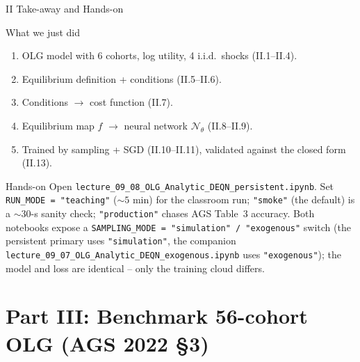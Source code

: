 \documentclass[aspectratio=169,11pt]{beamer}
\newcommand{\emphc}[1]{\textcolor{harvardcrimson}{#1}}
\newcommand{\N}{\mathcal{N}}
\begin{document}
\begin{frame}{II Take-away and Hands-on}
\footnotesize
\begin{block}{What we just did}
\begin{enumerate}\itemsep1pt
    \item OLG model with 6 cohorts, log utility, 4 i.i.d.\ shocks (II.1--II.4).
    \item Equilibrium definition + conditions (II.5--II.6).
    \item Conditions $\to$ \emphc{cost function} (II.7).
    \item Equilibrium map $f$ $\to$ neural network $\N_\theta$ (II.8--II.9).
    \item Trained by sampling + SGD (II.10--II.11), \emphc{validated} against the closed form (II.13).
\end{enumerate}
\end{block}

\begin{block}{Hands-on}
Open \texttt{lecture\_09\_08\_OLG\_Analytic\_DEQN\_persistent.ipynb}.  Set \texttt{RUN\_MODE = "teaching"} ($\sim 5$ min) for the classroom run; \texttt{"smoke"} (the default) is a $\sim$30-s sanity check; \texttt{"production"} chases AGS Table~3 accuracy.  Both notebooks expose a \texttt{SAMPLING\_MODE = "simulation" / "exogenous"} switch (the persistent primary uses \texttt{"simulation"}, the companion \texttt{lecture\_09\_07\_OLG\_Analytic\_DEQN\_exogenous.ipynb} uses \texttt{"exogenous"}); the model and loss are identical -- only the training cloud differs.
\end{block}
\end{frame}



\section{Part III: Benchmark 56-cohort OLG (AGS 2022 \S 3)}
\end{document}
